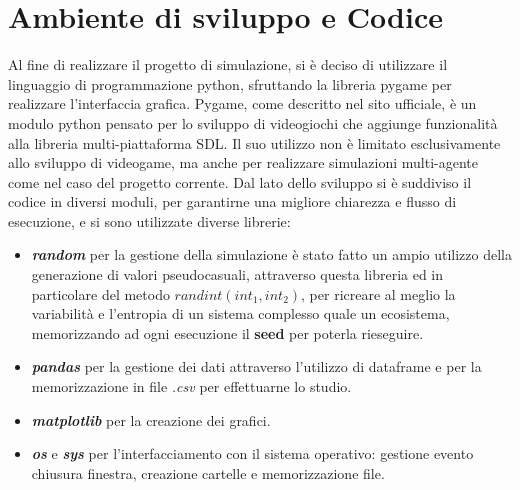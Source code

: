 \documentclass[11pt]{article}
\begin{document}
\section{Ambiente di sviluppo e Codice}
\label{sec:codice}
Al fine di realizzare il progetto di simulazione, si è deciso di utilizzare il linguaggio di programmazione python, sfruttando la libreria pygame per realizzare l'interfaccia grafica. Pygame, come descritto nel sito ufficiale\cite{PyGame}, è un modulo python pensato per lo sviluppo di videogiochi che aggiunge funzionalità alla libreria multi-piattaforma SDL. Il suo utilizzo non è limitato esclusivamente allo sviluppo di videogame, ma anche per realizzare simulazioni multi-agente come nel caso del progetto corrente. Dal lato dello sviluppo si è suddiviso il codice in diversi moduli, per garantirne una migliore chiarezza e flusso di esecuzione, e si sono utilizzate diverse librerie:
\begin{itemize}
    \item \textit{\textbf{random}} per la gestione della simulazione è stato fatto un ampio utilizzo della generazione di valori pseudocasuali, attraverso questa libreria ed in particolare del metodo $randint(int_1, int_2)$, per ricreare al meglio la variabilità e l'entropia di un sistema complesso quale un ecosistema, memorizzando ad ogni esecuzione il \textbf{seed} per poterla rieseguire.
    
    \item \textbf{\textit{pandas}} per la gestione dei dati attraverso l'utilizzo di dataframe e per la memorizzazione in file \textit{.csv} per effettuarne lo studio.
    
    \item \textbf{\textit{matplotlib}} per la creazione dei grafici.
    
    \item \textbf{\textit{\textit{os}}} e \textbf{\textit{sys}} per l'interfacciamento con il sistema operativo: gestione evento chiusura finestra, creazione cartelle e memorizzazione file.
    
\end{itemize} 
\end{document}
